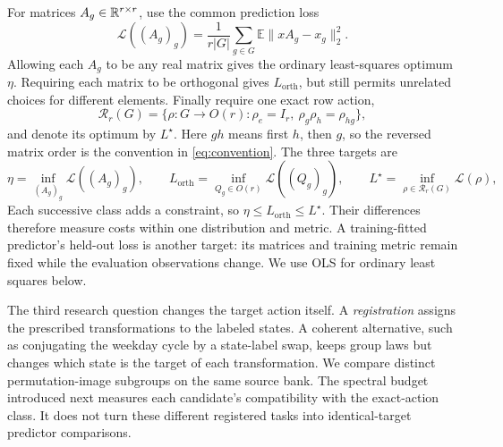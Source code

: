 For matrices $A_g\in\mathbb{R}^{r\times r}$, use the common prediction loss
\begin{equation}
 \mathcal L((A_g)_g)=\frac{1}{r|G|}\sum_{g\in G}
 \mathbb E\|xA_g-x_g\|_2^2.
 \label{eq:class-loss-main}
\end{equation}
Allowing each $A_g$ to be any real matrix gives the ordinary least-squares optimum $\eta$. Requiring each matrix to be orthogonal gives $L_{\mathrm{orth}}$, but still permits unrelated choices for different elements. Finally require one exact row action,
\[
 \mathcal R_r(G)=\{\rho:G\to O(r):\rho_e=I_r,\ \rho_g\rho_h=\rho_{hg}\},
\]
and denote its optimum by $L^\star$. Here $gh$ means first $h$, then $g$, so the reversed matrix order is the convention in \cref{eq:convention}. The three targets are
\[
 \eta=\inf_{(A_g)_g}\mathcal L((A_g)_g),\qquad
 L_{\mathrm{orth}}=\inf_{Q_g\in O(r)}\mathcal L((Q_g)_g),\qquad
 L^\star=\inf_{\rho\in\mathcal R_r(G)}\mathcal L(\rho),
\]
Each successive class adds a constraint, so $\eta\le L_{\mathrm{orth}}\le L^\star$. Their differences therefore measure costs within one distribution and metric. A training-fitted predictor's held-out loss is another target: its matrices and training metric remain fixed while the evaluation observations change. We use OLS for ordinary least squares below.

The third research question changes the target action itself. A \emph{registration} assigns the prescribed transformations to the labeled states. A coherent alternative, such as conjugating the weekday cycle by a state-label swap, keeps group laws but changes which state is the target of each transformation. We compare distinct permutation-image subgroups on the same source bank. The spectral budget introduced next measures each candidate's compatibility with the exact-action class. It does not turn these different registered tasks into identical-target predictor comparisons.

